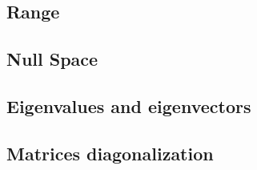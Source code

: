 \subsection{Range}
\subsection{Null Space}
\subsection{Eigenvalues and eigenvectors}
\subsection{Matrices diagonalization}